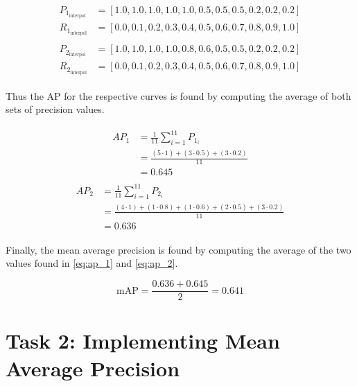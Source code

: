 \documentclass{article}
\begin{document}
\begin{align}
\begin{split}
    P_1_{\text{interpol}} &= [1.0, 1.0, 1.0, 1.0, 1.0, 0.5, 0.5,0.5, 0.2, 0.2, 0.2] \\
    R_1_{\text{interpol}} &= [0.0, 0.1, 0.2, 0.3, 0.4, 0.5, 0.6, 0.7, 0.8, 0.9, 1.0]
\end{split}
\label{eq:interpol_1}
\end{align}
\begin{align}
\begin{split}
    P_2_{\text{interpol}} &= [1.0, 1.0, 1.0, 1.0, 0.8, 0.6, 0.5, 0.5, 0.2, 0.2, 0.2] \\ 
    R_2_{\text{interpol}} &= [0.0, 0.1, 0.2, 0.3, 0.4, 0.5, 0.6, 0.7, 0.8, 0.9, 1.0]
\end{split}
\label{eq:interpol_2}
\end{align}

Thus the AP for the respective curves is found by computing the average of both sets of precision values.

\begin{align}
\begin{split}
AP_1 &= \frac{1}{11} \sum_{i = 1}^{11}  P_1_i \\
    &= \frac{(5\cdot 1) + (3\cdot 0.5) + (3\cdot 0.2)}{11}\\
    &= 0.645
\end{split}
\label{eq:ap_1}
\end{align}
\begin{align}
\begin{split}
AP_2 &= \frac{1}{11} \sum_{i = 1}^{11}  P_2_i \\
    &= \frac{(4\cdot 1) + (1\cdot 0.8) + (1\cdot 0.6) + (2\cdot 0.5) + (3\cdot 0.2)}{11}\\
    &= 0.636
\end{split}
\label{eq:ap_2}
\end{align}

Finally, the mean average precision is found by computing the average of the two values found in \autoref{eq:ap_1} and \autoref{eq:ap_2}. 

\begin{equation}
    \text{mAP} = \frac{0.636 + 0.645}{2} = 0.641
\end{equation}

\section{Task 2: Implementing Mean Average Precision}
\end{document}
